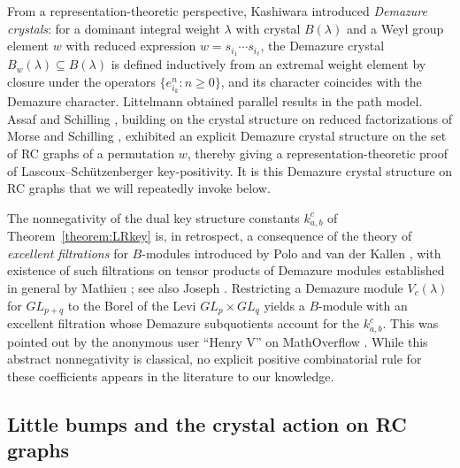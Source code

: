 \documentclass[a4paper,fleqn]{cas-sc}
\theoremstyle{definition}
\theoremstyle{remark}
\numberwithin{equation}{subsection}
\begin{document}
From a representation-theoretic perspective, Kashiwara \cite{kashiwara1993crystal} introduced \emph{Demazure crystals}: for a dominant integral weight $\lambda$ with crystal $B(\lambda)$ and a Weyl group element $w$ with reduced expression $w=s_{i_1}\cdots s_{i_\ell}$, the Demazure crystal $B_w(\lambda)\subseteq B(\lambda)$ is defined inductively from an extremal weight element by closure under the operators $\{e_{i_k}^n : n\geq 0\}$, and its character coincides with the Demazure character. Littelmann \cite{littelmann1995crystal} obtained parallel results in the path model. Assaf and Schilling \cite{assaf2018demazure}, building on the crystal structure on reduced factorizations of Morse and Schilling \cite{morse2016crystal}, exhibited an explicit Demazure crystal structure on the set of RC graphs of a permutation $w$, thereby giving a representation-theoretic proof of Lascoux--Schützenberger key-positivity. It is this Demazure crystal structure on RC graphs that we will repeatedly invoke below.

The nonnegativity of the dual key structure constants $k_{a,b}^c$ of Theorem~\ref{theorem:LRkey} is, in retrospect, a consequence of the theory of \emph{excellent filtrations} for $B$-modules introduced by Polo \cite{polo1989excellent} and van der Kallen \cite{vanderkallen1989longest}, with existence of such filtrations on tensor products of Demazure modules established in general by Mathieu \cite{mathieu1990filtrations}; see also Joseph \cite{joseph1985demazure}. Restricting a Demazure module $V_c(\lambda)$ for $GL_{p+q}$ to the Borel of the Levi $GL_p\times GL_q$ yields a $B$-module with an excellent filtration whose Demazure subquotients account for the $k_{a,b}^c$. This was pointed out by the anonymous user ``Henry V'' on MathOverflow \cite{henrymath}. While this abstract nonnegativity is classical, no explicit positive combinatorial rule for these coefficients appears in the literature to our knowledge.

\subsection{Little bumps and the crystal action on RC graphs}
\end{document}
